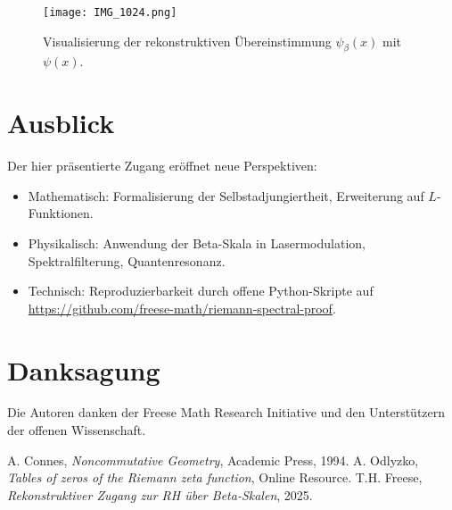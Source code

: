 \documentclass[11pt]{article}
\begin{document}
\begin{figure}[h]
    \centering
    \texttt{[image: IMG\_1024.png]}
    \caption{Visualisierung der rekonstruktiven Übereinstimmung $\psi_\beta(x)$ mit $\psi(x)$.}
    \label{fig:psi}
\end{figure}

\section{Ausblick}

Der hier präsentierte Zugang eröffnet neue Perspektiven:
\begin{itemize}[topsep=1pt]
  \item Mathematisch: Formalisierung der Selbstadjungiertheit, Erweiterung auf $L$-Funktionen.
  \item Physikalisch: Anwendung der Beta-Skala in Lasermodulation, Spektralfilterung, Quantenresonanz.
  \item Technisch: Reproduzierbarkeit durch offene Python-Skripte auf \url{https://github.com/freese-math/riemann-spectral-proof}.
\end{itemize}

\section*{Danksagung}

Die Autoren danken der Freese Math Research Initiative und den Unterstützern der offenen Wissenschaft.


\begin{thebibliography}{9}
 A. Connes, \textit{Noncommutative Geometry}, Academic Press, 1994.
 A. Odlyzko, \textit{Tables of zeros of the Riemann zeta function}, Online Resource.
 T.H. Freese, \textit{Rekonstruktiver Zugang zur RH über Beta-Skalen}, 2025.
\end{thebibliography}
\end{document}
